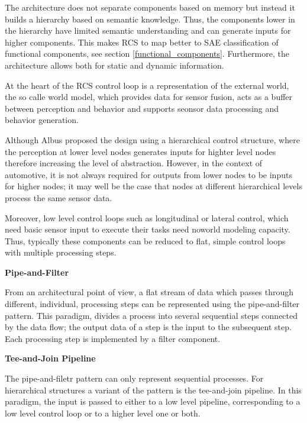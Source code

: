 The architecture does not separate components based on memory but instead it builds a hierarchy based on semantic knowledge. Thus, the components
lower in the hierarchy have limited semantic understanding and can generate inputs for higher components. This makes RCS to map better to SAE classification of 
functional components, see section \ref{functional_components}. Furthermore, the architecture allows both for static and dynamic information.

At the heart of the RCS control loop is a representation of the external world, the so calle world model, which provides data for sensor fusion, acts as a 
buffer between perception and behavior and supports seonsor data processing and behavior generation.

Although Albus proposed the design using a hierarchical control structure, where the perception at lower level nodes generates inputs for highter 
level nodes therefore increasing the level of abstraction. However, in the context of automotive, it is not always required for outputs from lower nodes to
be inputs for higher nodes; it may well be the case that nodes at different hierarchical levels process the same sensor data.  

Moreover, low level control loops such as longitudinal or lateral control, which need basic sensor input to execute their tasks need noworld modeling capacity. Thus, typically these
components can be reduced to flat, simple control loops with multiple processing steps. 


\begin{framed}

\textbf{Pipe-and-Filter}

From an architectural point of view, a flat stream of data which passes through different, individual, processing steps can be represented using the pipe-and-filter pattern. 
This paradigm, divides a process into several sequential steps connected by the data flow; the output data of a step is the input to the 
subsequent step. Each processing step is implemented by a filter component.  


\end{framed}

\begin{framed}

\textbf{Tee-and-Join Pipeline}

The pipe-and-filetr pattern can only represent sequential processes. For hierarchical structures a variant of the pattern is the tee-and-join pipeline.
In this paradigm, the input is passed to either to a low level pipeline, corresponding to a low level control loop or to a higher level one or both.

\end{framed}

